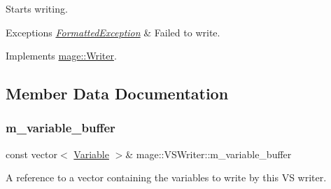 Starts writing.


\begin{DoxyExceptions}{Exceptions}
{\em \hyperlink{structmage_1_1_formatted_exception}{Formatted\+Exception}} & Failed to write. \\
\hline
\end{DoxyExceptions}


Implements \hyperlink{classmage_1_1_writer_a9baf695ef7f6180bef883f60bcb3ac07}{mage\+::\+Writer}.



\subsection{Member Data Documentation}
\hypertarget{classmage_1_1_v_s_writer_a4f36e6a94d4fd8d3038f189a76582abe}{}\label{classmage_1_1_v_s_writer_a4f36e6a94d4fd8d3038f189a76582abe} 
\subsubsection{\texorpdfstring{m\+\_\+variable\+\_\+buffer}{m\_variable\_buffer}}
{\footnotesize\ttfamily const vector$<$ \hyperlink{structmage_1_1_variable}{Variable} $>$\& mage\+::\+V\+S\+Writer\+::m\+\_\+variable\+\_\+buffer\hspace{0.3cm}{\ttfamily [private]}}

A reference to a vector containing the variables to write by this VS writer. 